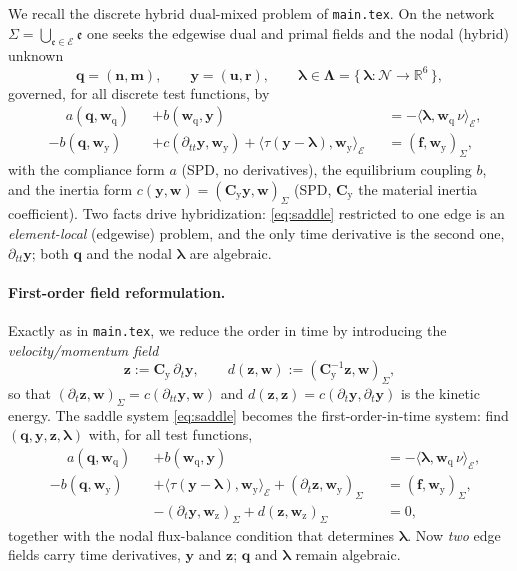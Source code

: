 \documentclass[11pt]{article}
\theoremstyle{remark}
\renewcommand{\vec}{\boldsymbol}
\newcommand{\bvec}[1]{\vec{#1}}
\newcommand{\setEdge}{\mathcal E}        %
\newcommand{\setNode}{\mathcal N}        %
\newcommand{\edge}{\mathfrak e}
\newcommand{\vLambda}{\vec\Lambda}       %
\newcommand{\vldh}{\bvec\lambda}         %
\newcommand{\del}{\partial}
\newcommand{\R}{\mathbb{R}}
\newcommand{\Cy}{\mathbf{C}_{\mathrm y}} %
\begin{document}
We recall the discrete hybrid dual-mixed problem of \texttt{main.tex}. On the
network $\Sigma=\bigcup_{\edge\in\setEdge}\edge$ one seeks the edgewise dual and
primal fields and the nodal (hybrid) unknown
\[
  \bvec q=(\bvec n,\bvec m),\qquad
  \bvec y=(\bvec u,\bvec r),\qquad
  \vldh\in\vLambda=\{\,\vec\lambda:\setNode\to\R^6\,\},
\]
governed, for all discrete test functions, by
\begin{subequations}\label{eq:saddle}
\begin{alignat}{3}
  &\phantom{{}-{}} a(\bvec q,\bvec w_{\mathrm q}) &&+ b(\bvec w_{\mathrm q},\bvec y)
    &&= -\langle \vldh,\bvec w_{\mathrm q}\,\nu\rangle_\setEdge, \label{eq:saddle-1}\\
  &-b(\bvec q,\bvec w_{\mathrm y})
    &&+ c(\del_{tt}\bvec y,\bvec w_{\mathrm y})
       +\langle\tau(\bvec y-\vldh),\bvec w_{\mathrm y}\rangle_\setEdge
    &&= (\vec f,\bvec w_{\mathrm y})_\Sigma, \label{eq:saddle-2}
\end{alignat}
\end{subequations}
with the compliance form $a$ (SPD, no derivatives), the equilibrium coupling $b$,
and the inertia form $c(\bvec y,\bvec w)=(\Cy\bvec y,\bvec w)_\Sigma$ (SPD, $\Cy$
the material inertia coefficient). Two facts drive hybridization: \eqref{eq:saddle}
restricted to one edge is an \emph{element-local} (edgewise) problem, and the only
time derivative is the second one, $\del_{tt}\bvec y$; both $\bvec q$ and the nodal
$\vldh$ are algebraic.

\paragraph{First-order field reformulation.}
Exactly as in \texttt{main.tex}, we reduce the order in time by introducing the
\emph{velocity/momentum field}
\begin{equation}\label{eq:zdef}
  \bvec z:=\Cy\,\del_t\bvec y,\qquad
  d(\bvec z,\bvec w):=(\Cy^{-1}\bvec z,\bvec w)_\Sigma,
\end{equation}
so that $(\del_t\bvec z,\bvec w)_\Sigma=c(\del_{tt}\bvec y,\bvec w)$ and
$d(\bvec z,\bvec z)=c(\del_t\bvec y,\del_t\bvec y)$ is the kinetic energy. The
saddle system \eqref{eq:saddle} becomes the first-order-in-time system: find
$(\bvec q,\bvec y,\bvec z,\vldh)$ with, for all test functions,
\begin{subequations}\label{eq:first-field}
\begin{alignat}{3}
  &\phantom{{}-{}} a(\bvec q,\bvec w_{\mathrm q}) &&+ b(\bvec w_{\mathrm q},\bvec y)
    &&= -\langle \vldh,\bvec w_{\mathrm q}\,\nu\rangle_\setEdge,\\
  &-b(\bvec q,\bvec w_{\mathrm y})
    &&+\langle\tau(\bvec y-\vldh),\bvec w_{\mathrm y}\rangle_\setEdge
      +(\del_t\bvec z,\bvec w_{\mathrm y})_\Sigma
    &&= (\vec f,\bvec w_{\mathrm y})_\Sigma,\\
  & &&-(\del_t\bvec y,\bvec w_{\mathrm z})_\Sigma
      +d(\bvec z,\bvec w_{\mathrm z})_\Sigma
    &&= 0,
\end{alignat}
\end{subequations}
together with the nodal flux-balance condition that determines $\vldh$. Now
\emph{two} edge fields carry time derivatives, $\bvec y$ and $\bvec z$; $\bvec q$
and $\vldh$ remain algebraic.
\end{document}
